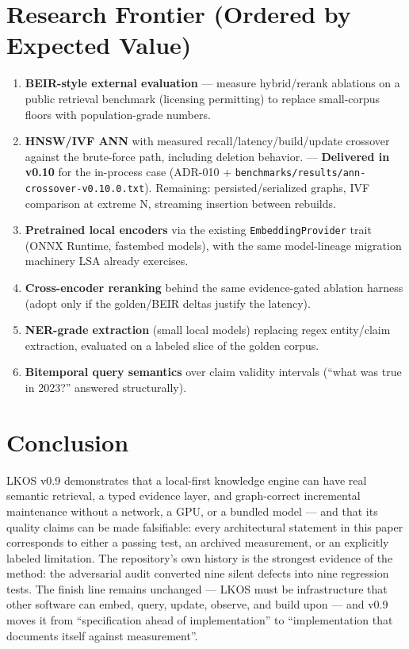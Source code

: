 \needspace{0.2\textheight}
\section{Research Frontier (Ordered by Expected Value)}\label{sec:frontier}

\begin{enumerate}[itemsep=3pt]
\item \textbf{BEIR-style external evaluation} --- measure hybrid/rerank
ablations on a public retrieval benchmark (licensing permitting) to replace
small-corpus floors with population-grade numbers.
\item \textbf{HNSW/IVF ANN} with measured recall/latency/build/update
crossover against the brute-force path, including deletion behavior. ---
\textbf{Delivered in v0.10} for the in-process case (ADR-010 +
\texttt{benchmarks/results/ann-crossover-v0.10.0.txt}). Remaining:
persisted/serialized graphs, IVF comparison at extreme N, streaming insertion
between rebuilds.
\item \textbf{Pretrained local encoders} via the existing
\texttt{EmbeddingProvider} trait (ONNX Runtime, fastembed models), with the
same model-lineage migration machinery LSA already exercises.
\item \textbf{Cross-encoder reranking} behind the same evidence-gated
ablation harness (adopt only if the golden/BEIR deltas justify the latency).
\item \textbf{NER-grade extraction} (small local models) replacing regex
entity/claim extraction, evaluated on a labeled slice of the golden corpus.
\item \textbf{Bitemporal query semantics} over claim validity intervals
(``what was true in 2023?'' answered structurally).
\end{enumerate}

\needspace{0.2\textheight}
\section{Conclusion}\label{sec:conclusion}

LKOS v0.9 demonstrates that a local-first knowledge engine can have real
semantic retrieval, a typed evidence layer, and graph-correct incremental
maintenance without a network, a GPU, or a bundled model --- and that its
quality claims can be made falsifiable: every architectural statement in this
paper corresponds to either a passing test, an archived measurement, or an
explicitly labeled limitation. The repository's own history is the strongest
evidence of the method: the adversarial audit converted nine silent defects
into nine regression tests. The finish line remains unchanged --- LKOS must be
infrastructure that other software can embed, query, update, observe, and
build upon --- and v0.9 moves it from ``specification ahead of
implementation'' to ``implementation that documents itself against
measurement''.

